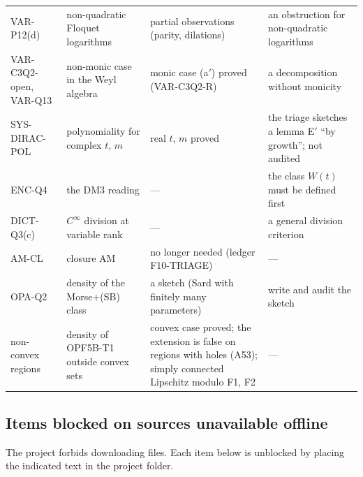 \begin{center}
\begin{longtable}{@{}L{2.5cm}L{4.0cm}L{4.2cm}L{4.0cm}@{}}
VAR-P12(d) & non-quadratic Floquet logarithms & partial observations (parity, dilations) & an obstruction for non-quadratic logarithms\\
VAR-C3Q2-open, VAR-Q13 & non-monic case in the Weyl algebra & monic case (a$'$) proved (VAR-C3Q2-R) & a decomposition without monicity\\
SYS-DIRAC-POL & polynomiality for complex $t$, $m$ & real $t$, $m$ proved & the triage sketches a lemma E$'$ ``by growth''; not audited\\
ENC-Q4 & the DM3 reading & --- & the class $W(t)$ must be defined first\\
DICT-Q3(c) & $C^\infty$ division at variable rank & --- & a general division criterion\\
AM-CL & closure AM & no longer needed (ledger F10-TRIAGE) & ---\\
OPA-Q2 & density of the Morse$+$(SB) class & a sketch (Sard with finitely many parameters) & write and audit the sketch\\
non-convex regions & density of OPF5B-T1 outside convex sets & convex case proved; the extension is false on regions with holes (A53); simply connected Lipschitz modulo F1, F2 & ---\\
\bottomrule
\end{longtable}
\end{center}

\subsection{Items blocked on sources unavailable offline}

The project forbids downloading files. Each item below is unblocked by placing the indicated text in the project folder.

